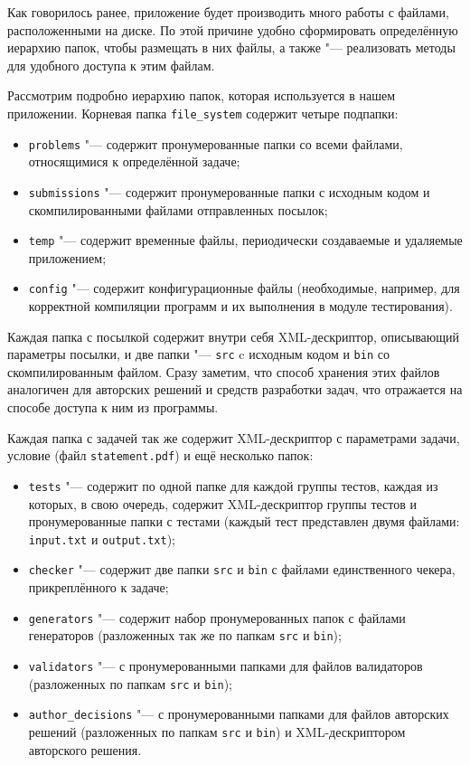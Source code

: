 Как говорилось ранее, приложение будет производить много работы с файлами, расположенными на диске. По этой причине удобно сформировать определённую иерархию папок, чтобы размещать в них файлы, а также "--- реализовать методы для удобного доступа к этим файлам.

Рассмотрим подробно иерархию папок, которая используется в нашем приложении. Корневая папка \texttt{file\_system} содержит четыре подпапки:

\begin{itemize}
\item \texttt{problems} "--- содержит пронумерованные папки со всеми файлами, относящимися к определённой задаче;
\item \texttt{submissions} "--- содержит пронумерованные папки с исходным кодом и скомпилированными файлами отправленных посылок;
\item \texttt{temp} "--- содержит временные файлы, периодически создаваемые и удаляемые приложением;
\item \texttt{config} "--- содержит конфигурационные файлы (необходимые, например, для корректной компиляции программ и их выполнения в модуле тестирования).
\end{itemize}

Каждая папка с посылкой содержит внутри себя XML-дескриптор, описывающий параметры посылки, и две папки "--- \texttt{src} c исходным кодом и \texttt{bin} со скомпилированным файлом. Сразу заметим, что способ хранения этих файлов аналогичен для авторских решений и средств разработки задач, что отражается на способе доступа к ним из программы.

Каждая папка с задачей так же содержит XML-дескриптор с параметрами задачи, условие (файл \texttt{statement.pdf}) и ещё несколько папок:

\begin{itemize}
\item \texttt{tests} "--- содержит по одной папке для каждой группы тестов, каждая из которых, в свою очередь, содержит XML-дескриптор группы тестов и пронумерованные папки с тестами (каждый тест представлен двумя файлами: \texttt{input.txt} и \texttt{output.txt});
\item \texttt{checker} "--- содержит две папки \texttt{src} и \texttt{bin} с файлами единственного чекера, прикреплённого к задаче;
\item \texttt{generators} "--- содержит набор пронумерованных папок с файлами генераторов (разложенных так же по папкам \texttt{src} и \texttt{bin});
\item \texttt{validators} "--- с пронумерованными папками для файлов валидаторов (разложенных по папкам \texttt{src} и \texttt{bin});
\item \texttt{author\_decisions} "--- с пронумерованными папками для файлов авторских решений (разложенных по папкам \texttt{src} и \texttt{bin}) и XML-дескриптором авторского решения.
\end{itemize}

